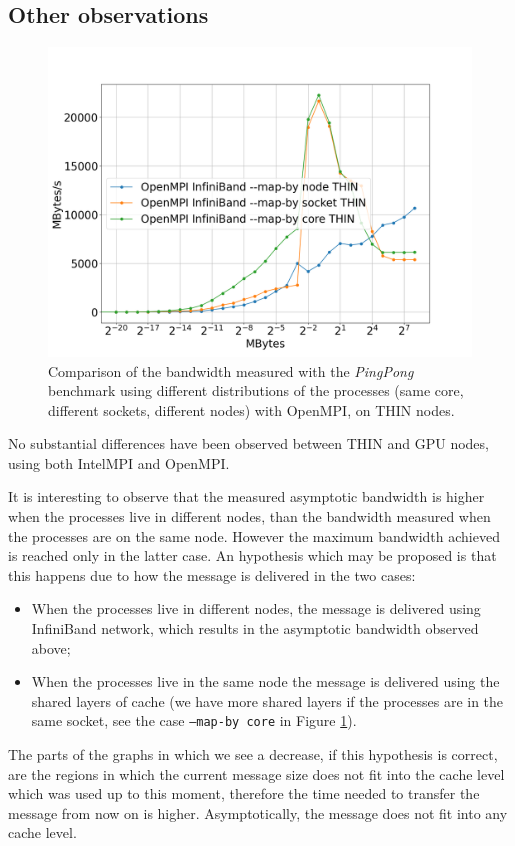 \documentclass{article}
\begin{document}
\subsection{Other observations}
\begin{figure}[t]
    \centering
    \includegraphics[width=\textwidth]{benchmark/mapby_bandwidth.png}
    \caption{Comparison of the bandwidth measured with the \emph{PingPong} benchmark using different distributions of the processes (same core, different sockets, different nodes) with OpenMPI, on THIN nodes.}
    \label{fig:mapby}
\end{figure}

No substantial differences have been observed between THIN and GPU nodes, using both IntelMPI and OpenMPI.

It is interesting to observe that the measured asymptotic bandwidth is higher when the processes live in different nodes, than the bandwidth measured when the processes are on the same node. However the maximum bandwidth achieved is reached only in the latter case. An hypothesis which may be proposed is that this happens due to how the message is delivered in the two cases:
\begin{itemize}
    \item When the processes live in different nodes, the message is delivered using InfiniBand network, which results in the asymptotic bandwidth observed above;
    \item When the processes live in the same node the message is delivered using the shared layers of cache (we have more shared layers if the processes are in the same socket, see the case \texttt{--map-by core} in Figure \ref{fig:mapby}).
\end{itemize}
The parts of the graphs in which we see a decrease, if this hypothesis is correct, are the regions in which the current message size does not fit into the cache level which was used up to this moment, therefore the time needed to transfer the message from now on is higher. Asymptotically, the message does not fit into any cache level.
\end{document}

